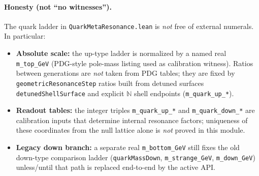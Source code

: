 \documentclass[11pt]{article}
\begin{document}
\paragraph{Honesty (not ``no witnesses'').}
The quark ladder in \texttt{QuarkMetaResonance.lean} is \emph{not} free of external numerals. In particular:
\begin{itemize}
  \item \textbf{Absolute scale:} the up-type ladder is normalized by a named real \texttt{m\_top\_GeV} (PDG-style pole-mass listing used as calibration witness). Ratios between generations are \emph{not} taken from PDG tables; they are fixed by \texttt{geometricResonanceStep} ratios built from detuned surfaces \texttt{detunedShellSurface} and explicit $\mathbb{N}$ shell endpoints (\texttt{m\_quark\_up\_*}).
  \item \textbf{Readout tables:} the integer triples \texttt{m\_quark\_up\_*} and \texttt{m\_quark\_down\_*} are calibration inputs that determine internal resonance factors; uniqueness of these coordinates from the null lattice alone is \emph{not} proved in this module.
  \item \textbf{Legacy down branch:} a separate real \texttt{m\_bottom\_GeV} still fixes the old down-type comparison ladder (\texttt{quarkMassDown}, \texttt{m\_strange\_GeV}, \texttt{m\_down\_GeV}) unless/until that path is replaced end-to-end by the active API.
\end{itemize}
\end{document}
